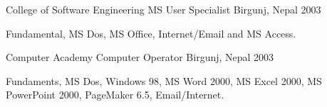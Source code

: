 

\begin{cventries}

  \cventry
    {College of Software Engineering} %
    {MS User Specialist} %
    {Birgunj, Nepal} %
    {2003} %
    {
      \begin{cvitems} %
        \item {Fundamental, MS Dos, MS Office, Internet/Email and MS Access.}        
      \end{cvitems}
    }

  \cventry
    {Computer Academy} %
    {Computer Operator} %
    {Birgunj, Nepal} %
    {2003} %
    {
      \begin{cvitems} %
        \item {Fundaments, MS Dos, Windows 98, MS Word 2000, MS Excel 2000, MS PowerPoint 2000,
PageMaker 6.5, Email/Internet.}        
      \end{cvitems}
    }


\end{cventries}
